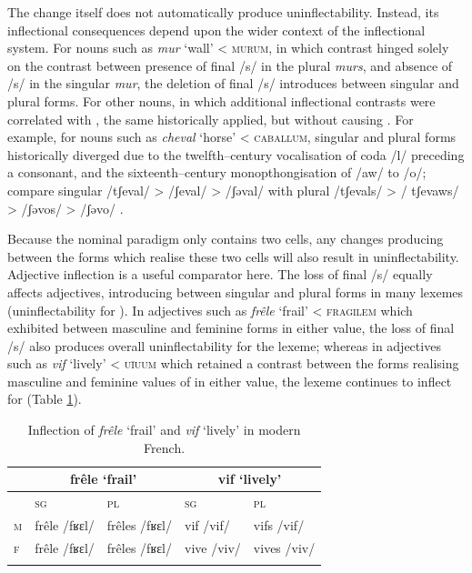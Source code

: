 \documentclass[output=paper,colorlinks,citecolor=brown]{langscibook}
\begin{document}
The change itself does not automatically produce uninflectability. Instead, its inflectional consequences depend upon the wider context of the inflectional system. For nouns such as \emph{mur} `wall' \textless{} \textsc{murum}, in which  contrast hinged solely on the contrast between presence of final /s/ in the plural \emph{murs}, and absence of /s/ in the singular \emph{mur}, the deletion of final /s/ introduces  between singular and plural forms. For other nouns, in which additional inflectional contrasts were correlated with , the same  historically applied, but without causing . For example, for nouns such as \emph{cheval} `horse' \textless{} \textsc{caballum}, singular and plural forms historically diverged due to the twelfth--century vocalisation of coda /l/ preceding a consonant, and the sixteenth--century monopthongisation of /aw/ to /o/; compare singular /tʃeval/ \textgreater{} /ʃeval/ \textgreater{} /ʃəval/ with plural /tʃevals/ \textgreater{} / tʃevaws/ \textgreater{} /ʃəvos/ > /ʃəvo/ \citep[153--155, 199--200, 246--247]{pope1934}.

Because the nominal paradigm only contains two cells, any changes producing  between the forms which realise these two cells will also result in uninflectability. Adjective inflection is a useful comparator here. The loss of final /s/ equally affects adjectives, introducing  between singular and plural forms in many lexemes (uninflectability for ). In adjectives such as \emph{frêle} `frail' \textless{} \textsc{fragilem} which exhibited  between masculine and feminine forms in either  value, the loss of final /s/ also produces overall uninflectability for the lexeme; whereas in adjectives such as \emph{vif} `lively' \textless{} \textsc{uīuum} which retained a contrast between the forms realising masculine and feminine values of  in either  value, the lexeme continues to inflect for  (Table \ref{06tab3}).

\begin{table}[ht]
	\centering
	\begin{tabularx}{0.75\textwidth}{lXXXX}
		\lsptoprule
			& \multicolumn{2}{c}{frêle ‘frail’} & \multicolumn{2}{c}{vif ‘lively’} \\
			\midrule
			& \textsc{sg} & \textsc{pl} & \textsc{sg} & \textsc{pl} \\
			\midrule
			\textsc{m} & frêle /fʁɛl/ & frêles /fʁɛl/ & vif /vif/ & vifs /vif/ \\
			\textsc{f} & frêle /fʁɛl/ & frêles /fʁɛl/ & vive /viv/ & vives /viv/ \\
		\lspbottomrule
	\end{tabularx}
	\caption{Inflection of \emph{frêle} ‘frail’ and \emph{vif} ‘lively’ in modern French.}
	\label{06tab3}
\end{table}
\end{document}

